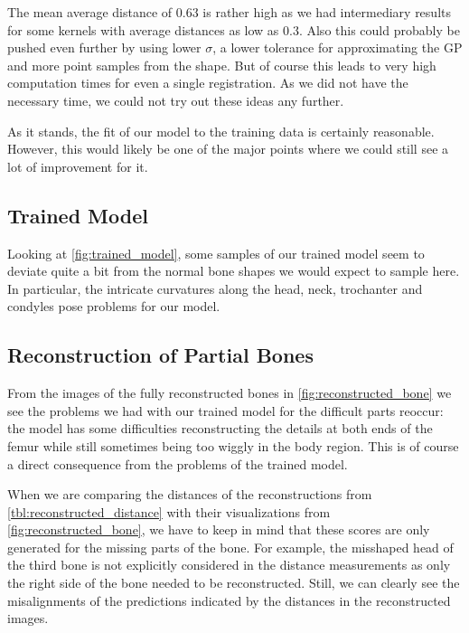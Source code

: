 The mean average distance of $0.63$ is rather high as we had intermediary results for some kernels with average distances as low as $0.3$. 
Also this could probably be pushed even further by using lower $\sigma$, a lower tolerance for approximating the GP and more point samples from the shape. 
But of course this leads to very high computation times for even a single registration.
As we did not have the necessary time, we could not try out these ideas any further.

As it stands, the fit of our model to the training data is certainly reasonable.
However, this would likely be one of the major points where we could still see a lot of improvement for it.


\subsection{Trained Model}
\label{subsec:trainedmodeldisc}

Looking at \autoref{fig:trained_model}, some samples of our trained model seem to deviate quite a bit from the normal bone shapes we would expect to sample here. 
In particular, the intricate curvatures along the head, neck, trochanter and condyles pose problems for our model.


\subsection{Reconstruction of Partial Bones}
\label{subsec:reconresultsdisc}

From the images of the fully reconstructed bones in \autoref{fig:reconstructed_bone} we see the problems we had with our trained model for the difficult parts reoccur: the model has some difficulties reconstructing the details at both ends of the femur while still sometimes being too wiggly in the body region. 
This is of course a direct consequence from the problems of the trained model.

When we are comparing the distances of the reconstructions from \autoref{tbl:reconstructed_distance} with their visualizations from \autoref{fig:reconstructed_bone}, we have to keep in mind that these scores are only generated for the missing parts of the bone. 
For example, the misshaped head of the third bone is not explicitly considered in the distance measurements as only the right side of the bone needed to be reconstructed. 
Still, we can clearly see the misalignments of the predictions indicated by the distances in the reconstructed images.

